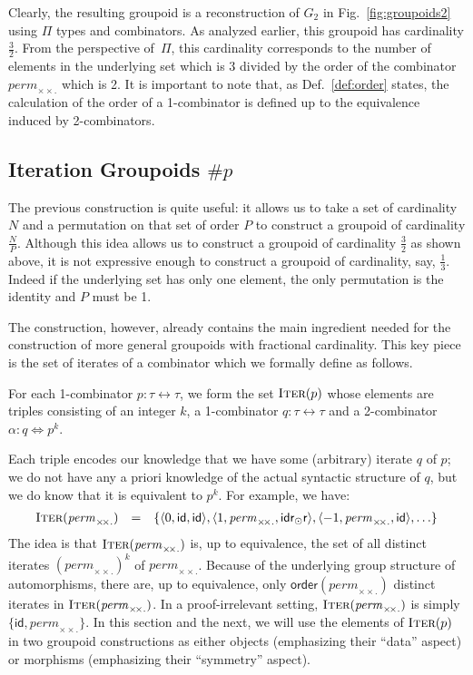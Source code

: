 \documentclass[a4paper,USenglish]{lipics-v2016-utf8x}
\newcommand{\hash}{\#}
\newcommand{\iso}{\leftrightarrow}
\newcommand{\isotwo}{\Leftrightarrow}
\newcommand{\order}[1]{\hash #1}
\newcommand{\ord}[1]{\ensuremath{\mathsf{order}(#1)}}
\newcommand{\iter}[1]{\textsc{Iter}(#1)}
\newcommand{\triple}[3]{\langle #1,#2,#3 \rangle}
\newcommand{\permtwo}{\mathit{perm}_{\times\!\times.}}
\newcommand{\idiso}{\mathsf{{id}}}
\newcommand{\idrdr}{\mathsf{{idr_{\odot}r}}}
\newcommand{\idisotwo}{\mathsf{{id}}}
\begin{document}
Clearly, the resulting groupoid is a reconstruction of $G_2$ in
Fig.~\ref{fig:groupoids2} using $\Pi$ types and combinators. As analyzed
earlier, this groupoid has cardinality $\frac{3}{2}$. From the perspective
of~$\Pi$, this cardinality corresponds to the number of elements in the
underlying set which is $3$ divided by the order of the combinator $\permtwo$
which is 2. It is important to note that, as Def.~\ref{def:order} states, the
calculation of the order of a 1-combinator is defined up to the equivalence
induced by 2-combinators.

\subsection{Iteration Groupoids $\order{p}$}

The previous construction is quite useful: it allows us to take a set of
cardinality $N$ and a permutation on that set of order $P$ to construct a
groupoid of cardinality $\frac{N}{P}$. Although this idea allows us to construct
a groupoid of cardinality $\frac{3}{2}$ as shown above, it is not expressive
enough to construct a groupoid of cardinality, say, $\frac{1}{3}$. Indeed if the
underlying set has only one element, the only permutation is the identity and
$P$ must be 1.

The construction, however, already contains the main ingredient needed for the construction of more general groupoids with fractional cardinality. This key piece is the set of iterates of a combinator which we formally define as follows.

\begin{definition}[$\iter{p}$]
For each 1-combinator $p : \tau\iso\tau$, we form the set $\iter{p}$ whose elements are triples consisting of an integer $k$, a 1-combinator $q : \tau\iso\tau$ and a 2-combinator $\alpha : q \isotwo p^k$.
\end{definition}
Each triple encodes our knowledge that we have some (arbitrary) iterate $q$ of $p$; we do not have any a priori knowledge of the actual syntactic structure of $q$, but we do know that it is equivalent to $p^k$. For example, we have:
\[\begin{array}{rcl}
 \iter{\permtwo} &=& \{ \triple{0}{\idiso}{\idisotwo},\triple{1}{\permtwo}{\idrdr}, \triple{-1}{\permtwo}{\idisotwo}, \ldots \}
\end{array}\]
The idea is that $\iter{\permtwo}$ is, up to equivalence, the set of all distinct iterates $(\permtwo)^k$ of $\permtwo$.  Because of the underlying group structure of automorphisms, there are, up to equivalence, only $\ord{\permtwo}$ distinct iterates in $\iter{\permtwo}$.  In a proof-irrelevant setting, $\iter{\permtwo}$ is simply $\{ \idiso, \permtwo \}$. In this section and the next, we will use the elements of $\iter{p}$ in two groupoid constructions as either objects (emphasizing their ``data'' aspect) or morphisms (emphasizing their ``symmetry'' aspect).
\end{document}
